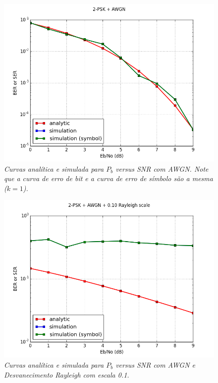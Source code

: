 \documentclass[a4paper,twocolumn]{article}
\begin{document}
\begin{figure}[h]
    \label{fig:2-psk_awgn}
    \centering
    \includegraphics[scale=0.40]{2-psk_awgn}
    \caption{\textit{Curvas analítica e simulada para $P_b$ versus SNR com AWGN. Note que a curva de erro de bit e a curva de erro de símbolo são a mesma ($k = 1$).}}
\end{figure}

\begin{figure}[h]
    \label{fig:2-psk_awgn_10_rayleigh}
    \centering
    \includegraphics[scale=0.40]{2-psk_awgn_10_rayleigh}
    \caption{\textit{Curvas analítica e simulada para $P_b$ versus SNR com AWGN e Desvanecimento Rayleigh com escala 0.1.}}
\end{figure}
\end{document}
